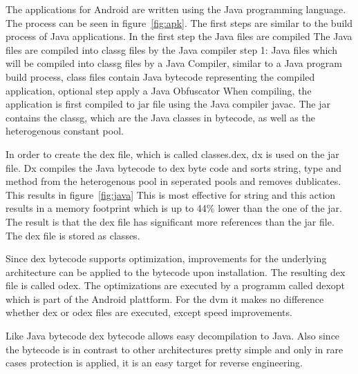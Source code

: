 The applications for Android are written using the Java programming language.
The process can be seen in figure~\ref{fig:apk}.
The first steps are similar to the build process of Java applications.
In the first step the Java files are compiled
The Java files are compiled into \gls{classg} files by the Java compiler
step 1:  Java files which will be compiled into \gls{classg} files by a Java Compiler,  similar to a Java program build process, class files contain Java bytecode representing the compiled application, optional step apply a Java Obfuscator\newline
When compiling, the application is first compiled to \gls{jar} file using the Java compiler javac.
The jar contains the \gls{classg}, which are the Java classes in bytecode, as well as the heterogenous constant pool.

In order to create the dex file, which is called classes.dex, dx is used on the \gls{jar} file.
Dx compiles the Java bytecode to \gls{dex} byte code and sorts string, type and method from the heterogenous pool in seperated pools and removes dublicates.
This results in figure~\ref{fig:java}
This is most effective for string and this action results in a memory footprint which is up to 44\% lower than the one of the \gls{jar}.
The result is that the \gls{dex} file has significant more references than the \gls{jar} file.
The \gls{dex} file is stored as classes.\cite{ehringerDalvik}

Since \gls{dex} bytecode supports optimization, improvements for the underlying architecture can be applied to the bytecode upon installation.
The resulting \gls{dex} file is called \gls{odex}.
The optimizations are executed by a programm called dexopt which is part of the Android plattform.
For the \gls{dvm} it makes no difference whether \gls{dex} or \gls{odex} files are executed, except speed improvements.

Like Java bytecode \gls{dex} bytecode allows easy decompilation to Java.
Also since the bytecode is in contrast to other architectures pretty simple and only in rare cases protection is applied, it is an easy target for reverse engineering.


%




